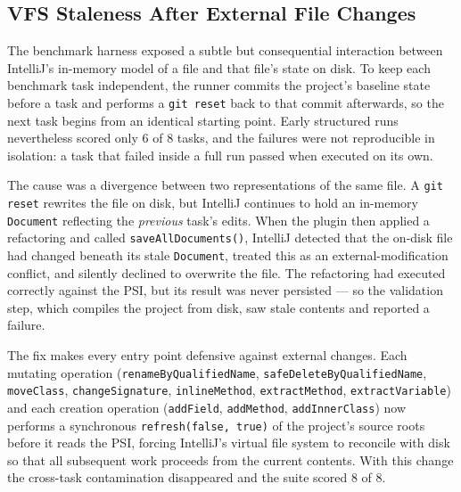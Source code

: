 \subsection{VFS Staleness After External File Changes}
\label{sec:impl-vfs}
The benchmark harness exposed a subtle but consequential interaction between
IntelliJ's in-memory model of a file and that file's state on disk. To keep each
benchmark task independent, the runner commits the project's baseline state
before a task and performs a \texttt{git reset} back to that commit afterwards,
so the next task begins from an identical starting point. Early structured runs
nevertheless scored only 6 of 8 tasks, and the failures were not reproducible in
isolation: a task that failed inside a full run passed when executed on its own.

The cause was a divergence between two representations of the same file. A
\texttt{git reset} rewrites the file on disk, but IntelliJ continues to hold an
in-memory \texttt{Document} reflecting the \emph{previous} task's edits. When the
plugin then applied a refactoring and called \texttt{saveAllDocuments()},
IntelliJ detected that the on-disk file had changed beneath its stale
\texttt{Document}, treated this as an external-modification conflict, and
silently declined to overwrite the file. The refactoring had executed correctly
against the PSI, but its result was never persisted --- so the validation step,
which compiles the project from disk, saw stale contents and reported a failure.

The fix makes every entry point defensive against external changes. Each mutating
operation (\texttt{renameByQualifiedName}, \texttt{safeDeleteByQualifiedName},
\texttt{moveClass}, \texttt{changeSignature}, \texttt{inlineMethod},
\texttt{extractMethod}, \texttt{extractVariable}) and each creation operation
(\texttt{addField}, \texttt{addMethod}, \texttt{addInnerClass}) now performs a
synchronous \texttt{refresh(false, true)} of the project's source roots before it
reads the PSI, forcing IntelliJ's virtual file system to reconcile with disk so
that all subsequent work proceeds from the current contents. With this change the
cross-task contamination disappeared and the suite scored 8 of 8.

